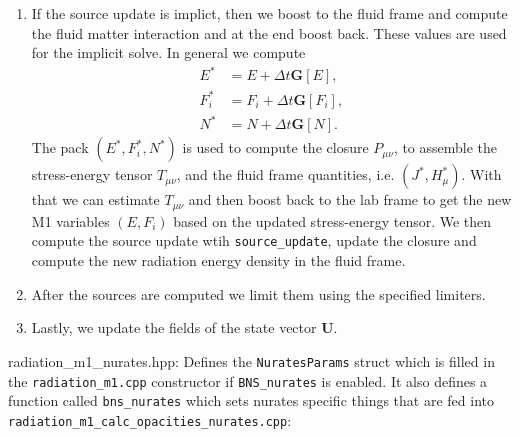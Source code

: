 \documentclass{article}
\newcommand{\var}[1]{%
  {\setlength{\fboxsep}{1.5pt}%
   \colorbox{varbg}{\textcolor{varfg}{\texttt{\small #1}}}}}
\begin{document}
\begin{enumerate}
\begin{align}
  \end{align}
  \item If the source update is implict, then we boost to the fluid frame and compute the fluid matter interaction and at the end boost back. These values are used for the implicit solve. In
  general we compute
  \begin{align}
    E^*&=E+\Delta t\mathbf{G}[E],\\
    F_i^*&=F_i+\Delta t\mathbf{G}[F_i],\\
    N^*&=N+\Delta t\mathbf{G}[N].
  \end{align}
  The pack $(E^*,F_i^*,N^*)$ is used to compute the closure $P_{\mu\nu}$, to assemble the stress-energy tensor $T_{\mu\nu}$, and the fluid frame quantities, i.e.
  $(J^*,H^*_{\mu})$. With that we can estimate $T_{\mu\nu}$ and then boost back to the lab frame to get the new M1 variables $(E,F_i)$ based on the updated stress-energy tensor.
  We then compute the source update wtih \var{source\_update}, update the closure and compute the new radiation energy density in the fluid frame.
  \item After the sources are computed we limit them using the specified limiters.
  \item Lastly, we update the fields of the state vector $\mathbf{U}$.
\end{enumerate}
{\color{gray}radiation\_m1\_nurates.hpp:} Defines the \var{NuratesParams} struct which is filled in the \var{radiation\_m1.cpp} constructor if \texttt{BNS\_nurates} is enabled. It also defines
a function called \var{bns\_nurates} which sets nurates specific things that are fed into\\ \var{radiation\_m1\_calc\_opacities\_nurates.cpp}:
\end{document}

